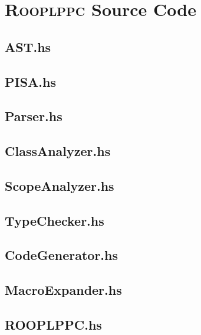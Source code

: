 \newcommand{\source}[1]{
    
}

\chapter{\textsc{Rooplppc} Source Code}
\label{app:rooplc-source}

\section*{AST.hs}
\source{../../../../IdeaProjects/ROOPLPPC/src/AST.hs}

\newpage
\section*{PISA.hs}
\source{../../../../IdeaProjects/ROOPLPPC/src/PISA.hs}
 
\newpage
\section*{Parser.hs}
\source{../../../../IdeaProjects/ROOPLPPC/src/Parser.hs} 

\newpage
\section*{ClassAnalyzer.hs}
\source{../../../../IdeaProjects/ROOPLPPC/src/ClassAnalyzer.hs}

\newpage
\section*{ScopeAnalyzer.hs}
\source{../../../../IdeaProjects/ROOPLPPC/src/ScopeAnalyzer.hs}

\newpage
\section*{TypeChecker.hs}
\source{../../../../IdeaProjects/ROOPLPPC/src/TypeChecker.hs}

\newpage
\section*{CodeGenerator.hs}
\source{../../../../IdeaProjects/ROOPLPPC/src/CodeGenerator.hs}

\newpage
\section*{MacroExpander.hs}
\source{../../../../IdeaProjects/ROOPLPPC/src/MacroExpander.hs}

\newpage
\section*{ROOPLPPC.hs} 
\source{../../../../IdeaProjects/ROOPLPPC/src/ROOPLPPC.hs}